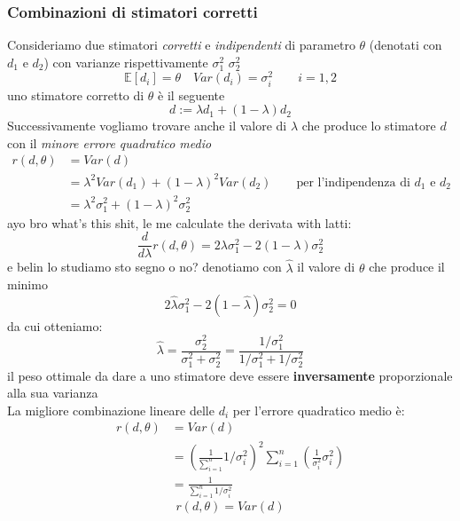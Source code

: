 \documentclass[]{article}
\newcommand{\ev}{\mathbb{E}[X]}
\renewcommand{\ev}[1]{\mathbb{E}\left[#1\right]}
\begin{document}
    \subsubsection{Combinazioni di stimatori corretti}
    Consideriamo due stimatori \textit{corretti} e \textit{indipendenti} di parametro $\theta$ (denotati con $d_1$ e $d_2$) con varianze rispettivamente $\sigma^2_1$ $\sigma^2_2$
    \[ \ev{d_i} = \theta \quad Var(d_i) = \sigma^2_i \qquad i=1,2  \]
    uno stimatore corretto di $\theta$ è il seguente
    \[ d := \lambda d_1 + (1- \lambda) d_2 \]
    Successivamente vogliamo trovare anche il valore di $\lambda$ che produce lo stimatore $d$ con il \textit{minore errore quadratico medio}
    \begin{equation*}
        \begin{split}
            r(d, \theta) &= Var(d) \\
            &= \lambda^2 Var(d_1) + (1- \lambda)^2 Var(d_2) \qquad \text{per l'indipendenza di $d_1$ e $d_2$} \\
            &= \lambda^2 \sigma^2_1 + (1-\lambda)^2 \sigma^2_2
        \end{split}
    \end{equation*}
    ayo bro what's this shit, le me calculate the derivata with latti:
    \[ \frac{d}{d \lambda} r(d, \theta) = 2 \lambda \sigma^2_1 - 2(1- \lambda) \sigma^2_2 \]
    e belin lo studiamo sto segno o no? denotiamo con $\hat{\lambda}$ il valore di $\theta$ che produce il minimo
    \[ 2 \hat{\lambda} \sigma^2_1 - 2(1- \hat{\lambda}) \sigma^2_2 = 0 \]
    da cui otteniamo:
    \[ \hat{\lambda} = \frac{\sigma^2_2}{\sigma^2_1 + \sigma^2_2} = \frac{1 / \sigma^2_1}{1 / \sigma^2_1 + 1 / \sigma^2_2} \]
    il peso ottimale da dare a uno stimatore deve essere \textbf{inversamente} proporzionale alla sua varianza \\
    La migliore combinazione lineare delle $d_i$ per l'errore quadratico medio è:
    \begin{equation*}
        \begin{split}
            r(d, \theta) &= Var(d) \\
            &= \left( \frac{1}{\sum_{i=1}^{n}} 1 / \sigma^2_i \right)^2 \sum_{i=1}^{n} \left( \frac{1}{\sigma^2_i} \sigma^2_i \right) \\
            &= \frac{1}{\sum_{i=1}^{n} 1 / \sigma^2_i}
        \end{split}
    \end{equation*}
    \[ r(d, \theta) = Var(d) \]
\end{document}
